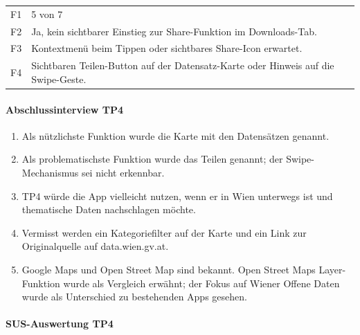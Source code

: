 \documentclass{article}
\begin{document}
\begin{tabular}{@{}lp{10cm}@{}}
  F1 & 5 von 7 \\
  F2 & Ja, kein sichtbarer Einstieg zur Share-Funktion im Downloads-Tab. \\
  F3 & Kontextmenü beim Tippen oder sichtbares Share-Icon erwartet. \\
  F4 & Sichtbaren Teilen-Button auf der Datensatz-Karte oder Hinweis
       auf die Swipe-Geste. \\
\end{tabular}

\paragraph{Abschlussinterview TP4}

\begin{enumerate}
  \item Als nützlichste Funktion wurde die Karte mit den Datensätzen genannt.
  \item Als problematischste Funktion wurde das Teilen genannt; der
        Swipe-Mechanismus sei nicht erkennbar.
  \item TP4 würde die App vielleicht nutzen, wenn er in Wien unterwegs ist und
        thematische Daten nachschlagen möchte.
  \item Vermisst werden ein Kategoriefilter auf der Karte und ein Link
        zur Originalquelle auf data.wien.gv.at.
  \item Google Maps und Open Street Map sind bekannt. Open Street Maps
        Layer-Funktion wurde als Vergleich erwähnt; der Fokus auf Wiener
        Offene Daten wurde als Unterschied zu bestehenden Apps gesehen.
\end{enumerate}

\paragraph{SUS-Auswertung TP4}
\end{document}
